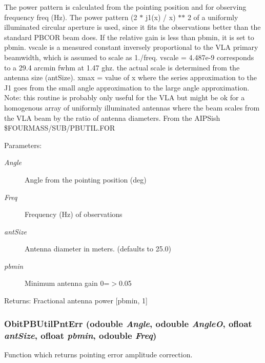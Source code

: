 The power pattern is calculated from the pointing position and for observing frequency freq (Hz). The power pattern (2 $\ast$ j1(x) / x) $\ast$$\ast$ 2 of a uniformly illuminated circular aperture is used, since it fits the observations better than the standard PBCOR beam does. If the relative gain is less than pbmin, it is set to pbmin. vscale is a measured constant inversely proportional to the VLA primary beamwidth, which is assumed to scale as 1./freq. vscale = 4.487e-9 corresponds to a 29.4 arcmin fwhm at 1.47 ghz. the actual scale is determined from the antenna size (ant\-Size). xmax = value of x where the series approximation to the J1 goes from the small angle approximation to the large angle approximation. Note: this routine is probably only useful for the VLA but might be ok for a homogenous array of uniformly illuminated antennas where the beam scales from the VLA beam by the ratio of antenna diameters. From the AIPSish \$FOURMASS/SUB/PBUTIL.FOR \begin{Desc}
\item[Parameters:]
\begin{description}
\item[{\em Angle}]Angle from the pointing position (deg) \item[{\em Freq}]Frequency (Hz) of observations \item[{\em ant\-Size}]Antenna diameter in meters. (defaults to 25.0) \item[{\em pbmin}]Minimum antenna gain 0=$>$0.05 \end{description}
\end{Desc}
\begin{Desc}
\item[Returns:]Fractional antenna power [pbmin, 1] \end{Desc}
\subsubsection{ Obit\-PBUtil\-Pnt\-Err ({\bf odouble} {\em Angle}, {\bf odouble} {\em Angle\-O}, {\bf ofloat} {\em ant\-Size}, {\bf ofloat} {\em pbmin}, {\bf odouble} {\em Freq})}\label{ObitPBUtil_8c_a3}


Function which returns pointing error amplitude correction. 

